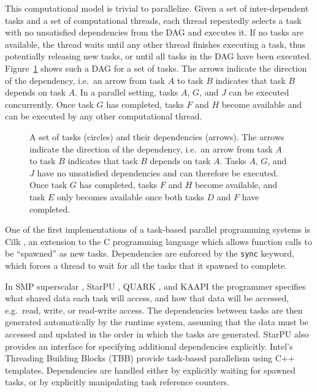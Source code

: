 \documentclass[preprint]{elsarticle}
\newcommand{\fig}[1]
    {Figure~\ref{fig:#1}}
\begin{document}
This computational model is trivial to parallelize.
Given a set of inter-dependent tasks and a set of computational
threads, each thread repeatedly selects a task with no
unsatisfied dependencies from the DAG and executes it.
If no tasks are available, the thread waits until any other
thread finishes executing a task, thus potentially releasing
new tasks, or until all tasks in the DAG have been executed.
\fig{Tasks} shows such a DAG for a set of tasks.
The arrows indicate the direction of the dependency, i.e.~an
arrow from task $A$ to task $B$ indicates that task $B$ depends
on task $A$.
In a parallel setting, tasks $A$, $G$, and $J$ can be
executed concurrently.
Once task $G$ has completed, tasks $F$ and $H$ become available
and can be executed by any other computational thread.

\begin{figure}
    \centerline{}
    \caption{A set of tasks (circles) and their dependencies (arrows).
        The arrows indicate the direction of the dependency, i.e.~an
        arrow from task $A$ to task $B$ indicates that task $B$ depends
        on task $A$.
        Tasks $A$, $G$, and $J$ have no unsatisfied dependencies and
        can therefore be executed.
        Once task $G$ has completed, tasks $F$ and $H$ become available,
        and task $E$ only becomes available once both tasks $D$ and $F$
        have completed.}
    \label{fig:Tasks}
\end{figure}

One of the first implementations of a task-based parallel programming
systems is Cilk \cite{ref:Blumofe1995}, an extension to the C
programming language which allows function calls to be ``spawned''
as new tasks.
Dependencies are enforced by the {\tt sync} keyword, which
forces a thread to wait for all the tasks that it spawned
to complete.

In SMP superscalar \cite{ref:Perez2008}, StarPU \cite{ref:Augonnet2011},
QUARK \cite{ref:Yarkhan2011}, and KAAPI \cite{ref:Gautier2007}
the programmer specifies
what shared data each task will access, and how that data will
be accessed, e.g.~read, write, or read-write access.
The dependencies between tasks are then generated
automatically by the runtime system, assuming that the
data must be accessed and updated in the order in which
the tasks are generated.
StarPU also provides an interface for specifying additional
dependencies explicitly.
Intel's Threading Building Blocks (TBB)
\cite{ref:Reinders2010}
provide task-based parallelism using C++ templates.
Dependencies are handled either by explicitly waiting
for spawned tasks, or by explicitly manipulating
task reference counters.
\end{document}
